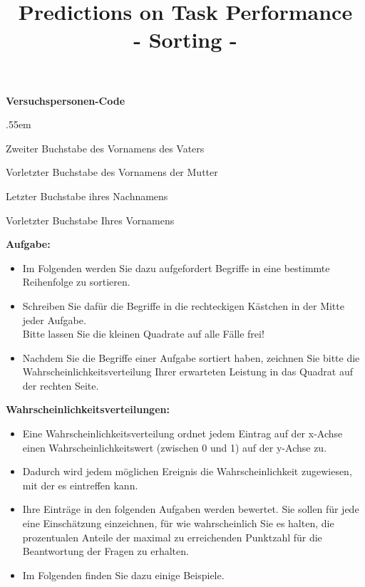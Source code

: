 \documentclass[
ngerman,
accentcolor=9c,%
identbarcolor=9c,
]{tudaexercise}
\title{Predictions on Task Performance\\- Sorting -}
\begin{document}
\maketitle
\vspace{-3mm}


\textbf{Versuchspersonen-Code}
\begin{itemize}
	\begin{minipage}{.45\textwidth}
		\vspace{-2cm}
		\itemsep.55em
		\item Zweiter Buchstabe des Vornamens des Vaters
		\item Vorletzter Buchstabe des Vornamens der Mutter
		\item Letzter Buchstabe ihres Nachnamens
		\item Vorletzter Buchstabe Ihres Vornamens	
	\end{minipage}
	\begin{minipage}{.55\textwidth}
		
	\end{minipage}
\end{itemize}

\textbf{Aufgabe:}
\begin{itemize}
	\item Im Folgenden werden Sie dazu aufgefordert Begriffe in eine bestimmte Reihenfolge zu sortieren.
	\item Schreiben Sie dafür die Begriffe in die rechteckigen Kästchen in der Mitte jeder Aufgabe.\\Bitte lassen Sie die kleinen Quadrate auf alle Fälle frei!
	\item Nachdem Sie die Begriffe einer Aufgabe sortiert haben, zeichnen Sie bitte die Wahrscheinlichkeitsverteilung Ihrer erwarteten Leistung in das  Quadrat auf der rechten Seite.
	
\end{itemize}

\textbf{Wahrscheinlichkeitsverteilungen:}
\begin{itemize}
	\item Eine Wahrscheinlichkeitsverteilung ordnet jedem Eintrag auf der x-Achse einen Wahrscheinlichkeitswert (zwischen 0 und 1) auf der y-Achse zu.
	\item Dadurch wird jedem möglichen Ereignis die Wahrscheinlichkeit zugewiesen, mit der es eintreffen kann.
	\item Ihre Einträge in den folgenden Aufgaben werden bewertet. Sie sollen für jede eine Einschätzung einzeichnen, für wie wahrscheinlich Sie es halten, die prozentualen Anteile der maximal zu erreichenden Punktzahl für die Beantwortung der Fragen zu erhalten. 
	\item Im Folgenden finden Sie dazu einige Beispiele.
\end{itemize}
\end{document}
